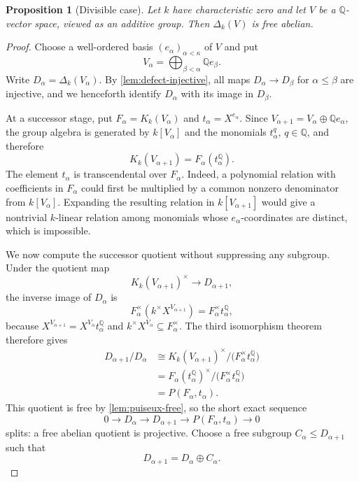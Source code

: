 \documentclass[11pt,a4paper]{article}
\numberwithin{equation}{section}
\theoremstyle{plain}
\newtheorem{proposition}[theorem]{Proposition}
\theoremstyle{definition}
\theoremstyle{remark}
\newcommand{\Q}{\mathbb Q}
\newcommand{\Kk}[1]{K_k(#1)}
\newcommand{\Dk}[1]{\Delta_k(#1)}
\newcommand{\mon}[1]{X^{#1}}
\begin{document}
\begin{proposition}[Divisible case]\label{prop:defect-vector-space}
Let $k$ have characteristic zero and let $V$ be a $\Q$-vector space,
viewed as an additive group.  Then $\Dk V$ is free abelian.
\end{proposition}

\begin{proof}
Choose a well-ordered basis $(e_\alpha)_{\alpha<\kappa}$ of $V$ and put
\[
  V_\alpha=\bigoplus_{\beta<\alpha}\Q e_\beta.
\]
Write $D_\alpha=\Dk{V_\alpha}$.  By
\cref{lem:defect-injective}, all maps $D_\alpha\to D_\beta$ for
$\alpha\leq\beta$ are injective, and we henceforth identify $D_\alpha$
with its image in $D_\beta$.

At a successor stage, put $F_\alpha=\Kk{V_\alpha}$ and
$t_\alpha=\mon{e_\alpha}$.  Since
$V_{\alpha+1}=V_\alpha\oplus\Q e_\alpha$, the group algebra is generated
by $k[V_\alpha]$ and the monomials $t_\alpha^q$, $q\in\Q$, and therefore
\[
  \Kk{V_{\alpha+1}}
  =F_\alpha(t_\alpha^{\Q}).
\]
The element $t_\alpha$ is transcendental over $F_\alpha$.  Indeed, a
polynomial relation with coefficients in $F_\alpha$ could first be
multiplied by a common nonzero denominator from $k[V_\alpha]$.  Expanding
the resulting relation in $k[V_{\alpha+1}]$ would give a nontrivial
$k$-linear relation among monomials whose $e_\alpha$-coordinates are
distinct, which is impossible.

We now compute the successor quotient without suppressing any subgroup.
Under the quotient map
\[
  \Kk{V_{\alpha+1}}^\times\longrightarrow D_{\alpha+1},
\]
the inverse image of $D_\alpha$ is
\[
  F_\alpha^\times(k^\times X^{V_{\alpha+1}})
  =F_\alpha^\times t_\alpha^\Q,
\]
because $X^{V_{\alpha+1}}=X^{V_\alpha}t_\alpha^\Q$ and
$k^\times X^{V_\alpha}\subseteq F_\alpha^\times$.  The third isomorphism
theorem therefore gives
\begin{align*}
  D_{\alpha+1}/D_\alpha
  &\cong
  \Kk{V_{\alpha+1}}^\times/
  \bigl(F_\alpha^\times t_\alpha^{\Q}\bigr)\\
  &=F_\alpha(t_\alpha^\Q)^\times/
  \bigl(F_\alpha^\times t_\alpha^\Q\bigr)\\
  &=P(F_\alpha,t_\alpha).
\end{align*}
This quotient is free by \cref{lem:puiseux-free}, so the short exact
sequence
\[
  0\longrightarrow D_\alpha\longrightarrow D_{\alpha+1}
  \longrightarrow P(F_\alpha,t_\alpha)\longrightarrow0
\]
splits: a free abelian quotient is projective.  Choose a free subgroup
$C_\alpha\leq D_{\alpha+1}$ such that
\begin{equation}\label{eq:defect-successor-splitting}
  D_{\alpha+1}=D_\alpha\oplus C_\alpha.
\end{equation}


\end{proof}
\end{document}
